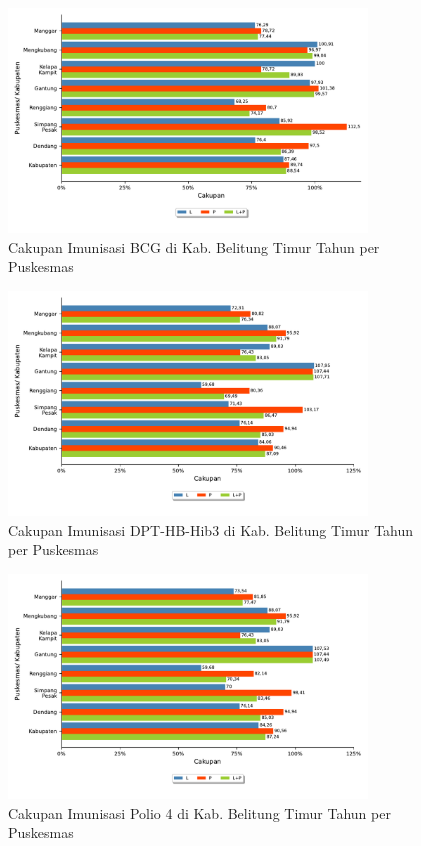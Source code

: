 \begin{figure}[H]
    \centering
    \includegraphics[width=0.85\textwidth]{bab_05/bab_05_18b_imunBCG}
    \caption{Cakupan Imunisasi BCG di Kab. Belitung Timur Tahun \tP per Puskesmas}
    \label{fig:Cakupan-Imunisasi-BCG}
\end{figure}

\begin{figure}[H]
    \centering
    \includegraphics[width=0.85\textwidth]{bab_05/bab_05_19a_imunDPT}
    \caption{Cakupan Imunisasi DPT-HB-Hib3 di Kab. Belitung Timur Tahun \tP per Puskesmas}
    \label{fig:Cakupan-Imunisasi-DPT}
\end{figure}

\begin{figure}[H]
    \centering
    \includegraphics[width=0.85\textwidth]{bab_05/bab_05_19b_imunPol4}
    \caption{Cakupan Imunisasi Polio 4 di Kab. Belitung Timur Tahun \tP per Puskesmas}
    \label{fig:Cakupan-Imunisasi-Polio4}
\end{figure}

